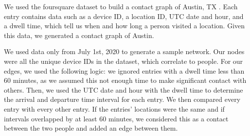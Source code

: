 \documentclass[times, 10pt,twocolumn]{article}
\begin{document}















We used the foursquare dataset to build a contact graph of Austin, TX \cite{DVN/PFLAH4_2020}. Each entry contains data such as a device ID, a location ID, UTC date and hour, and a dwell time, which tell us when and how long a person visited a location. Given this data, we generated a contact graph of Austin.

We used data only from July 1st, 2020 to generate a sample network. Our nodes were all the unique device IDs in the dataset, which correlate to people. For our edges, we used the following logic: we ignored entries with a dwell time less than 60 minutes, as we assumed this not enough time to make significant contact with others. Then, we used the UTC date and hour with the dwell time to determine the arrival and departure time interval for each entry. We then compared every entry with every other entry. If the entries' locations were the same and if intervals overlapped by at least 60 minutes, we considered this as a contact between the two people and added an edge between them.
\end{document}
